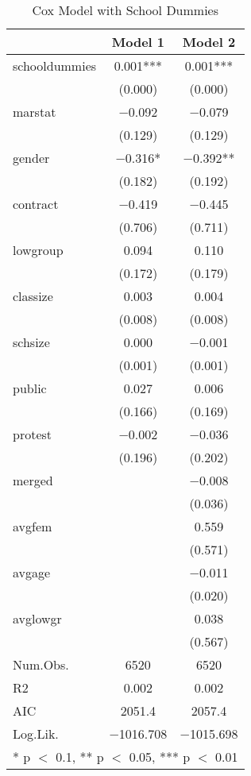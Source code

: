 \documentclass[
]{article}
\begin{document}
\begin{table}[!h]
\caption{\label{tab:unnamed-chunk-28}Cox Model with School Dummies}
\centering
\fontsize{8}{10}\selectfont
\begin{tabular}[t]{lcc}
\toprule
  & Model 1 & Model 2\\
\midrule
schooldummies & \num{0.001}*** & \num{0.001}***\\
 & (\num{0.000}) & (\num{0.000})\\
marstat & \num{-0.092} & \num{-0.079}\\
 & (\num{0.129}) & (\num{0.129})\\
gender & \num{-0.316}* & \num{-0.392}**\\
 & (\num{0.182}) & (\num{0.192})\\
contract & \num{-0.419} & \num{-0.445}\\
 & (\num{0.706}) & (\num{0.711})\\
lowgroup & \num{0.094} & \num{0.110}\\
 & (\num{0.172}) & (\num{0.179})\\
classize & \num{0.003} & \num{0.004}\\
 & (\num{0.008}) & (\num{0.008})\\
schsize & \num{0.000} & \num{-0.001}\\
 & (\num{0.001}) & (\num{0.001})\\
public & \num{0.027} & \num{0.006}\\
 & (\num{0.166}) & (\num{0.169})\\
protest & \num{-0.002} & \num{-0.036}\\
 & (\num{0.196}) & (\num{0.202})\\
merged &  & \num{-0.008}\\
 &  & (\num{0.036})\\
avgfem &  & \num{0.559}\\
 &  & (\num{0.571})\\
avgage &  & \num{-0.011}\\
 &  & (\num{0.020})\\
avglowgr &  & \num{0.038}\\
 &  & (\num{0.567})\\
\midrule
Num.Obs. & \num{6520} & \num{6520}\\
R2 & \num{0.002} & \num{0.002}\\
AIC & \num{2051.4} & \num{2057.4}\\
Log.Lik. & \num{-1016.708} & \num{-1015.698}\\
\bottomrule
\multicolumn{3}{l}{\rule{0pt}{1em}* p $<$ 0.1, ** p $<$ 0.05, *** p $<$ 0.01}\\
\end{tabular}
\end{table}
\end{document}
